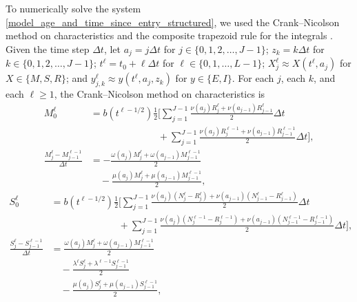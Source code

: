 \documentclass{jpmarticle}
\begin{document}
To numerically solve the system
\eqref{model_age_and_time_since_entry_structured}, we used the
Crank--Nicolson method on characteristics and the composite trapezoid
rule for the integrals \autocite{milner_1992}.  Given the time step
$\Delta t$, let $a_j = j \Delta t$ for
$j \in \{0, 1, 2, \ldots, J - 1\}$;
$z_k = k \Delta t$
for $k \in \{0, 1, 2, \ldots, J - 1\}$;
$t^{\ell} = t_0 + \ell \Delta t$ for
$\ell \in \{0, 1, \ldots, L - 1\}$;
$X_j^{\ell} \approx X(t^{\ell}, a_j)$
for $X \in \{M, S, R\}$;
and $y_{j, k}^{\ell} \approx y(t^{\ell}, a_j, z_k)$
for $y \in \{E, I\}$.
For each $j$, each $k$, and each $\ell \geq 1$, the Crank--Nicolson
method on characteristics is
\begin{equation}
  \begin{split}
    M_0^{\ell}
    &=
    b(t^{\ell - 1 / 2})
    \frac{1}{2}
    \Bigg[
    \sum_{j = 1}^{J - 1}
    \frac{\nu(a_j) R_j^{\ell} + \nu(a_{j - 1}) R_{j - 1}^{\ell}}{2}
    \Delta t
    \\ & \quad\quad\quad\quad\quad\quad\quad {}
    + \sum_{j = 1}^{J - 1}
    \frac{\nu(a_j) R_j^{\ell - 1} + \nu(a_{j - 1}) R_{j - 1}^{\ell - 1}}{2}
    \Delta t
    \Bigg],
    \\
    \frac{M_j^{\ell} - M_{j - 1}^{\ell - 1}}{\Delta t}
    &=
    - \frac{\omega(a_j) M_j^{\ell}
      + \omega(a_{j - 1}) M_{j - 1}^{\ell - 1}}
    {2}
    \\ & \quad {}
    - \frac{\mu(a_j) M_j^{\ell}
      + \mu(a_{j - 1}) M_{j - 1}^{\ell - 1}}
    {2},
  \end{split}
\end{equation}
\begin{equation}
  \begin{split}
    S_0^{\ell}
    &=
    b(t^{\ell - 1 / 2})
    \frac{1}{2}
    \Bigg[
    \sum_{j = 1}^{J - 1}
    \frac{\nu(a_j) (N_j^{\ell} - R_j^{\ell})
      + \nu(a_{j - 1}) (N_{j - 1}^{\ell} - R_{j - 1}^{\ell})}
    {2}
    \Delta t
    \\ & \quad\quad\quad\quad\quad\quad\quad {}
    + \sum_{j = 1}^{J - 1}
    \frac{\nu(a_j) (N_j^{\ell - 1} - R_j^{\ell - 1})
      + \nu(a_{j - 1}) (N_{j - 1}^{\ell - 1} - R_{j - 1}^{\ell - 1})}
    {2}
    \Delta t
    \Bigg],
    \\
    \frac{S_j^{\ell} - S_{j - 1}^{\ell - 1}}{\Delta t}
    &=
    \frac{\omega(a_j) M_j^{\ell}
      + \omega(a_{j - 1}) M_{j - 1}^{\ell - 1}}
    {2}
    \\ & \quad {}
    - \frac{\lambda^{\ell} S_j^{\ell}
      + \lambda^{\ell - 1} S_{j - 1}^{\ell - 1}}
    {2}
    \\ & \quad {}
    - \frac{\mu(a_j) S_j^{\ell}
      + \mu(a_{j - 1}) S_{j - 1}^{\ell - 1}}
    {2},
  \end{split}
\end{equation}
\end{document}
